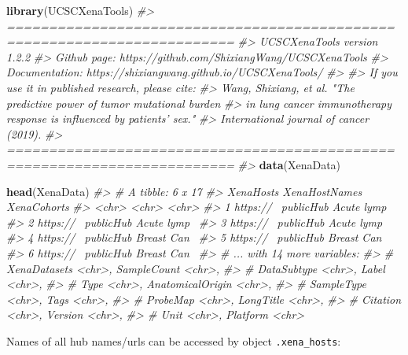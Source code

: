 \documentclass[nofonts,]{tufte-handout}
\newenvironment{Shaded}{\begin{snugshade}}{\end{snugshade}}
\newcommand{\CommentTok}[1]{\textcolor[rgb]{0.56,0.35,0.01}{\textit{#1}}}
\newcommand{\KeywordTok}[1]{\textcolor[rgb]{0.13,0.29,0.53}{\textbf{#1}}}
\newcommand{\NormalTok}[1]{#1}
\begin{document}
\begin{Shaded}
\begin{Highlighting}[]
\KeywordTok{library}\NormalTok{(UCSCXenaTools)}
\CommentTok{#> =========================================================================}
\CommentTok{#> UCSCXenaTools version 1.2.2}
\CommentTok{#> Github page: https://github.com/ShixiangWang/UCSCXenaTools}
\CommentTok{#> Documentation: https://shixiangwang.github.io/UCSCXenaTools/}
\CommentTok{#> }
\CommentTok{#> If you use it in published research, please cite:}
\CommentTok{#> Wang, Shixiang, et al. "The predictive power of tumor mutational burden}
\CommentTok{#>     in lung cancer immunotherapy response is influenced by patients' sex."}
\CommentTok{#>     International journal of cancer (2019).}
\CommentTok{#> =========================================================================}
\CommentTok{#> }
\KeywordTok{data}\NormalTok{(XenaData)}

\KeywordTok{head}\NormalTok{(XenaData)}
\CommentTok{#> # A tibble: 6 x 17}
\CommentTok{#>   XenaHosts XenaHostNames XenaCohorts}
\CommentTok{#>   <chr>     <chr>         <chr>      }
\CommentTok{#> 1 https://~ publicHub     Acute lymp~}
\CommentTok{#> 2 https://~ publicHub     Acute lymp~}
\CommentTok{#> 3 https://~ publicHub     Acute lymp~}
\CommentTok{#> 4 https://~ publicHub     Breast Can~}
\CommentTok{#> 5 https://~ publicHub     Breast Can~}
\CommentTok{#> 6 https://~ publicHub     Breast Can~}
\CommentTok{#> # ... with 14 more variables:}
\CommentTok{#> #   XenaDatasets <chr>, SampleCount <chr>,}
\CommentTok{#> #   DataSubtype <chr>, Label <chr>,}
\CommentTok{#> #   Type <chr>, AnatomicalOrigin <chr>,}
\CommentTok{#> #   SampleType <chr>, Tags <chr>,}
\CommentTok{#> #   ProbeMap <chr>, LongTitle <chr>,}
\CommentTok{#> #   Citation <chr>, Version <chr>,}
\CommentTok{#> #   Unit <chr>, Platform <chr>}
\end{Highlighting}
\end{Shaded}

Names of all hub names/urls can be accessed by object
\texttt{.xena\_hosts}:
\end{document}
